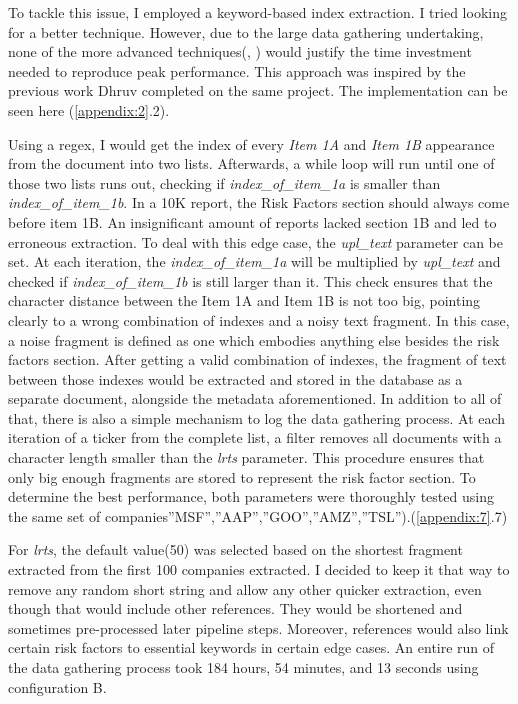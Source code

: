 \documentclass[12pt,MSc,a4paper,oneside]{muthesis}
\begin{document}
To tackle this issue, I employed a keyword-based index extraction. I tried looking for a better technique. However, due to the large data gathering undertaking, none of the more advanced techniques(\cite{SOUILI2015635},  \cite{clarity-nlp}) would justify the time investment needed to reproduce peak performance. This approach was inspired by the previous work Dhruv completed on the same project\cite{dhruv}. The implementation can be seen here (\ref{appendix:2}.2).
 
Using a regex, I would get the index of every \textit{Item 1A} and \textit{Item  1B} appearance from the document into two lists. Afterwards, a while loop will run until one of those two lists runs out, checking if \textit{index\_of\_item\_1a} is smaller than \textit{index\_of\_item\_1b}. In a 10K report, the Risk Factors section should always come before item 1B. An insignificant amount of reports lacked section 1B and led to erroneous extraction. To deal with this edge case, the\textit{ upl\_text} parameter can be set.
At each iteration, the \textit{index\_of\_item\_1a} will be multiplied by \textit{upl\_text }and checked if \textit{index\_of\_item\_1b} is still larger than it. This check ensures that the character distance between the Item 1A and Item 1B is not too big, pointing clearly to a wrong combination of indexes and a noisy text fragment. In this case, a noise fragment is defined as one which embodies anything else besides the risk factors section. After getting a valid combination of indexes, the fragment of text between those indexes would be extracted and stored in the database as a separate document, alongside the metadata aforementioned.
 In addition to all of that, there is also a simple mechanism to log the data gathering process. At each iteration of a ticker from the complete list, a filter removes all documents with a character length smaller than the \textit{lrts} parameter. This procedure ensures that only big enough fragments are stored to represent the risk factor section.
To determine the best performance, both parameters were thoroughly tested using the same set of companies''MSF'',''AAP'',''GOO'',''AMZ'',''TSL'').(\ref{appendix:7}.7) 

For \textit{lrts}, the default value(50) was selected based on the shortest fragment extracted from the first 100 companies extracted. I decided to keep it that way to remove any random short string and allow any other quicker extraction, even though that would include other references. They would be shortened and sometimes pre-processed later pipeline steps. Moreover, references would also link certain risk factors to essential keywords in certain edge cases.
An entire run of the data gathering process took 184 hours, 54 minutes, and 13 seconds using configuration B.
\end{document}
